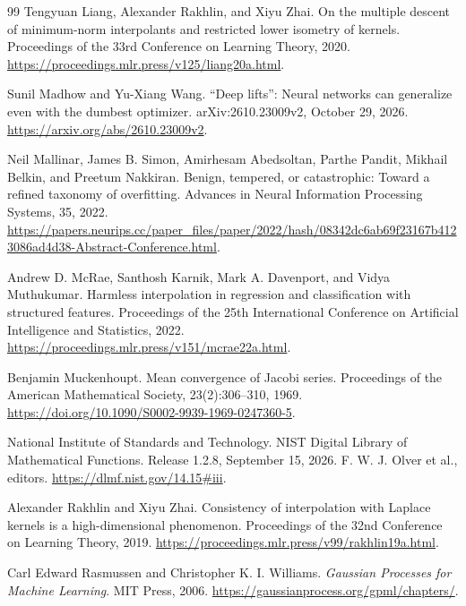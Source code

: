 \documentclass[11pt,twoside]{article}
\theoremstyle{definition}
\theoremstyle{remark}
\begin{document}
\begin{thebibliography}{99}
Tengyuan Liang, Alexander Rakhlin, and Xiyu Zhai.
\newblock On the multiple descent of minimum-norm interpolants and restricted
lower isometry of kernels.
\newblock Proceedings of the 33rd Conference on Learning Theory, 2020.
\newblock \url{https://proceedings.mlr.press/v125/liang20a.html}.

Sunil Madhow and Yu-Xiang Wang.
\newblock ``Deep lifts'': Neural networks can generalize even with the
dumbest optimizer.
\newblock arXiv:2610.23009v2, October 29, 2026.
\newblock \url{https://arxiv.org/abs/2610.23009v2}.

Neil Mallinar, James B. Simon, Amirhesam Abedsoltan, Parthe Pandit,
Mikhail Belkin, and Preetum Nakkiran.
\newblock Benign, tempered, or catastrophic: Toward a refined taxonomy of
overfitting.
\newblock Advances in Neural Information Processing Systems, 35, 2022.
\newblock \url{https://papers.neurips.cc/paper_files/paper/2022/hash/08342dc6ab69f23167b4123086ad4d38-Abstract-Conference.html}.

Andrew D. McRae, Santhosh Karnik, Mark A. Davenport, and Vidya Muthukumar.
\newblock Harmless interpolation in regression and classification with
structured features.
\newblock Proceedings of the 25th International Conference on Artificial
Intelligence and Statistics, 2022.
\newblock \url{https://proceedings.mlr.press/v151/mcrae22a.html}.

Benjamin Muckenhoupt.
\newblock Mean convergence of Jacobi series.
\newblock Proceedings of the American Mathematical Society,
23(2):306--310, 1969.
\newblock \url{https://doi.org/10.1090/S0002-9939-1969-0247360-5}.

National Institute of Standards and Technology.
\newblock NIST Digital Library of Mathematical Functions.
\newblock Release 1.2.8, September 15, 2026. F. W. J. Olver et al., editors.
\newblock \url{https://dlmf.nist.gov/14.15#iii}.

Alexander Rakhlin and Xiyu Zhai.
\newblock Consistency of interpolation with Laplace kernels is a
high-dimensional phenomenon.
\newblock Proceedings of the 32nd Conference on Learning Theory, 2019.
\newblock \url{https://proceedings.mlr.press/v99/rakhlin19a.html}.

Carl Edward Rasmussen and Christopher K. I. Williams.
\newblock \emph{Gaussian Processes for Machine Learning}.
\newblock MIT Press, 2006.
\newblock \url{https://gaussianprocess.org/gpml/chapters/}.


\end{thebibliography}
\end{document}
